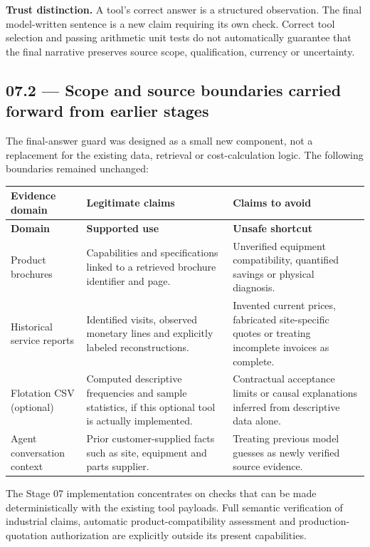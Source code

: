 \documentclass[11pt,a4paper]{article}
\begin{document}
\textbf{Trust distinction.} A tool's correct answer is a structured observation. The final model-written sentence is a new claim requiring its own check. Correct tool selection and passing arithmetic unit tests do not automatically guarantee that the final narrative preserves source scope, qualification, currency or uncertainty.

\subsection{07.2 --- Scope and source boundaries carried forward from earlier stages}
The final-answer guard was designed as a small new component, not a replacement for the existing data, retrieval or cost-calculation logic. The following boundaries remained unchanged:
\begin{longtable}{@{}L{37mm}L{65mm}L{43mm}@{}}
\toprule
\textbf{Evidence domain} & \textbf{Legitimate claims} & \textbf{Claims to avoid}\\\midrule\endfirsthead
\toprule\textbf{Domain} & \textbf{Supported use} & \textbf{Unsafe shortcut}\\\midrule\endhead
Product brochures & Capabilities and specifications linked to a retrieved brochure identifier and page. & Unverified equipment compatibility, quantified savings or physical diagnosis.\\
Historical service reports & Identified visits, observed monetary lines and explicitly labeled reconstructions. & Invented current prices, fabricated site-specific quotes or treating incomplete invoices as complete.\\
Flotation CSV (optional) & Computed descriptive frequencies and sample statistics, if this optional tool is actually implemented. & Contractual acceptance limits or causal explanations inferred from descriptive data alone.\\
Agent conversation context & Prior customer-supplied facts such as site, equipment and parts supplier. & Treating previous model guesses as newly verified source evidence.\\
\bottomrule
\end{longtable}

The Stage 07 implementation concentrates on checks that can be made deterministically with the existing tool payloads. Full semantic verification of industrial claims, automatic product-compatibility assessment and production-quotation authorization are explicitly outside its present capabilities.
\end{document}
